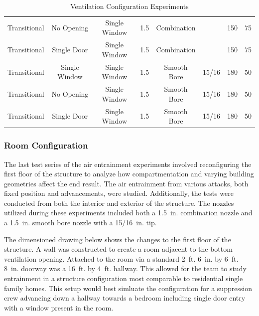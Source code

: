 \documentclass{article}
\begin{document}
\begin{table}[!ht]
{\begin{tabular}{|lccccccc|}
Transitional & No Opening & Single Window & 1.5 & Combination &  & 150 & 75 \\
Transitional & Single Door & Single Window & 1.5 & Combination &  & 150 & 75 \\
Transitional & Single Window & Single Window & 1.5 & Smooth Bore & 15/16 & 180 & 50 \\
Transitional & No Opening & Single Window & 1.5 & Smooth Bore & 15/16 & 180 & 50 \\
Transitional & Single Door & Single Window & 1.5 & Smooth Bore & 15/16 & 180 & 50 \\ \hline
\end{tabular}}
\caption{Ventilation Configuration Experiments}
\label{Ventilation_Configuration_Experiments}
\end{table}

\clearpage

\subsubsection{Room Configuration}

The last test series of the air entrainment experiments involved reconfiguring the first floor of the structure to analyze how compartmentation and varying building geometries affect the end result. The air entrainment from various attacks, both fixed position and advancements, were studied. Additionally, the tests were conducted from both the interior and exterior of the structure. The nozzles utilized during these experiments included both a 1.5~in. combination nozzle and a 1.5~in. smooth bore nozzle with a 15/16~in. tip.

The dimensioned drawing below shows the changes to the first floor of the structure. A wall was constructed to create a room adjacent to the bottom ventilation opening. Attached to the room via a standard 2~ft. 6~in. by 6~ft. 8~in. doorway was a 16~ft. by 4~ft. hallway. This allowed for the team to study entrainment in a structure configuration most comparable to residential single family homes. This setup would best simluate the configuration for a suppression crew advancing down a hallway towards a bedroom including single door entry with a window present in the room. 
\end{document}
